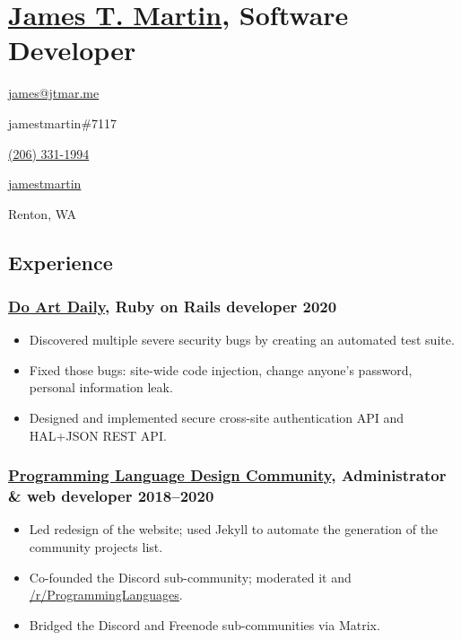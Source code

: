 \documentclass[12pt]{extarticle}
\author{James T. Martin}
\begin{document}
\section{\href{https://jamestmartin.me}{James T. Martin}, Software Developer}
\begin{description}[noitemsep,labelwidth=2cm]
\item[Email] \href{mailto:James\%20Martin<james@jtmar.me>}{james@jtmar.me}
\item[Discord] jamestmartin\#7117
\item[Phone] \href{tel:+1-206-331-1994}{(206) 331-1994}
\item[GitHub] \href{https://github.com/jamestmartin}{jamestmartin}
\item[Location] Renton, WA
\end{description}

\subsection{Experience}
\subsubsection{\href{https://dad.gallery}{Do Art Daily}, Ruby on Rails developer \hfill 2020}
\begin{itemize}
\item Discovered multiple severe security bugs by creating an automated test suite.
\item Fixed those bugs: site-wide code injection, change anyone's password, personal information leak.
\item Designed and implemented secure cross-site authentication API and HAL+JSON REST API.
\end{itemize}

\subsubsection{\href{https://proglangdesign.net}{Programming Language Design Community}, Administrator \& web developer \hfill 2018–2020}
\begin{itemize}
\item Led redesign of the website; used Jekyll to automate the generation of the community projects list.
\item Co-founded the Discord sub-community; moderated it and \href{https://reddit.com/r/ProgrammingLanguages}{/r/ProgrammingLanguages}.
\item Bridged the Discord and Freenode sub-communities via Matrix.
\end{itemize}
\end{document}
